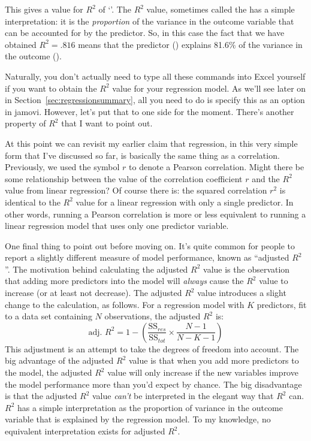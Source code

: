 This gives a value for $R^2$ of `'. The $R^2$ value, sometimes called the  has a simple interpretation: it is the {\it proportion} of the variance in the outcome variable that can be accounted for by the predictor. So, in this case the fact that we have obtained $R^2 = .816$ means that the predictor () explains 81.6\% of the variance in the outcome (). 

Naturally, you don't actually need to type all these commands into Excel yourself if you want to obtain the $R^2$ value for your regression model. As we'll see later on in Section~\ref{sec:regressionsummary}, all you need to do is specify this as an option in jamovi. However, let's put that to one side for the moment. There's another property of $R^2$ that I want to point out. 


At this point we can revisit my earlier claim that regression, in this very simple form that I've discussed so far, is basically the same thing as a correlation. Previously, we used the symbol $r$ to denote a Pearson correlation. Might there be some relationship between the value of the correlation coefficient $r$ and the $R^2$ value from linear regression? Of course there is: the squared correlation $r^2$ is identical to the $R^2$ value for a linear regression with only a single predictor. In other words, running a Pearson correlation is more or less equivalent to running a linear regression model that uses only one predictor variable.


One final thing to point out before moving on. It's quite common for people to report a slightly different measure of model performance, known as ``adjusted $R^2$''. The motivation behind calculating the adjusted $R^2$ value is the observation that adding more predictors into the model will {\it always} cause the $R^2$ value to increase (or at least not decrease). The adjusted $R^2$ value introduces a slight change to the calculation, as follows. For a regression model with $K$ predictors, fit to a data set containing $N$ observations, the adjusted $R^2$ is:
$$
\mbox{adj. } R^2 = 1 - \left(\frac{\mbox{SS}_{res}}{\mbox{SS}_{tot}} \times \frac{N-1}{N-K-1} \right)
$$
This adjustment is an attempt to take the degrees of freedom into account. The big advantage of the adjusted $R^2$ value is that when you add more predictors to the model, the adjusted $R^2$ value will only increase if the new variables improve the model performance more than you'd expect by chance. The big disadvantage is that the adjusted $R^2$ value {\it can't} be interpreted in the elegant way that $R^2$ can. $R^2$ has a simple interpretation as the proportion of variance in the outcome variable that is explained by the regression model. To my knowledge, no equivalent interpretation exists for adjusted $R^2$. 

